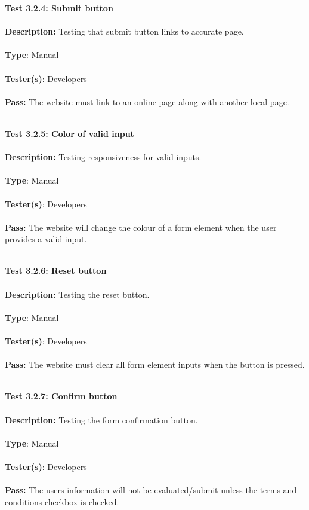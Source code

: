 \documentclass[12pt]{article}
\begin{document}
\begin{tcolorbox}
\textbf{Test 3.2.4: Submit button} \\ \\
\textbf{Description:} Testing that submit button links to accurate page. \\ \\
\textbf{Type}: Manual \\ \\
\textbf{Tester(s)}: Developers \\ \\
\textbf{Pass:} The website must link to an online page along with another local page. \\ \\
\end{tcolorbox}

\begin{tcolorbox}
\textbf{Test 3.2.5: Color of valid input} \\ \\
\textbf{Description:} Testing responsiveness for valid inputs.  \\ \\
\textbf{Type}: Manual \\ \\
\textbf{Tester(s)}: Developers \\ \\
\textbf{Pass:} The website will change the colour of a form element when the user provides a valid input. \\ \\
\end{tcolorbox}

\begin{tcolorbox}
\textbf{Test 3.2.6: Reset button} \\ \\
\textbf{Description:} Testing the reset button.  \\ \\
\textbf{Type}: Manual \\ \\
\textbf{Tester(s)}: Developers \\ \\
\textbf{Pass:} The website must clear all form element inputs when the button is pressed. \\ \\
\end{tcolorbox}

\begin{tcolorbox}
\textbf{Test 3.2.7: Confirm button} \\ \\
\textbf{Description:} Testing the form confirmation button. \\ \\
\textbf{Type}: Manual \\ \\
\textbf{Tester(s)}: Developers \\ \\
\textbf{Pass:} The user\textquotesingle s information will not be evaluated/submit unless the terms and conditions checkbox is checked. \\ \\
\end{tcolorbox}
\end{document}
